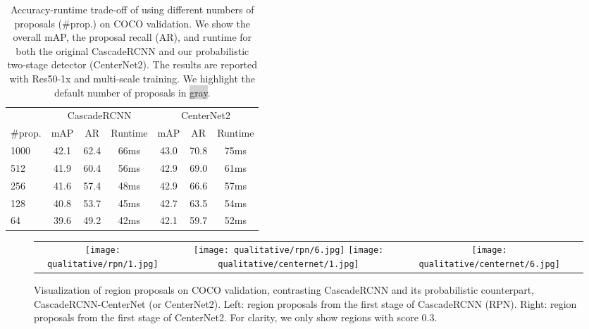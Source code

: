 \documentclass{article}
\begin{document}
\begin{table}[!t]
\centering
\begin{tabular}{@{}l@{\ \ }c@{\ \ \ }c@{\ \ \ }c@{\ \ \ }c@{\ \ \ }c@{\ \ \ }c}
\toprule
 & \multicolumn{3}{c}{CascadeRCNN} & \multicolumn{3}{c}{CenterNet2} \\
\#prop. & mAP & AR & Runtime & mAP & AR & Runtime \\
\cmidrule(r){1-1}
\cmidrule(r){2-4}
\cmidrule(r){5-7}
\rowcolor{lightgray}1000 & 42.1 & 62.4 &  66ms & \cellcolor{white}43.0 & \cellcolor{white}70.8  & \cellcolor{white}75ms \\
512 & 41.9 & 60.4 & 56ms & 42.9 & 69.0 & 61ms \\
\rowcolor{lightgray}\cellcolor{white}256 & \cellcolor{white}41.6 & \cellcolor{white}57.4 & \cellcolor{white} 48ms & 42.9 &  66.6 & 57ms \\
128 & 40.8 & 53.7 & 45ms & 42.7 & 63.5 & 54ms \\
64 & 39.6 & 49.2 & 42ms & 42.1 & 59.7 & 52ms \\
\bottomrule
\end{tabular}
\vspace{-2mm}
\caption{Accuracy-runtime trade-off of using different numbers of proposals (\#prop.) on COCO validation. We show the overall mAP, the proposal recall (AR), and runtime for both the original CascadeRCNN and our probabilistic two-stage detector (CenterNet2). The results are reported with Res50-1x and multi-scale training. We highlight the default number of proposals in \colorbox{lightgray}{gray}.}
\label{table:num_proposals}
\vspace{-6mm}
\end{table}



{
\begin{figure*}[t]
\centering
     \begin{tabular}{c@{}c@{}c@{}c}
      \texttt{[image: qualitative/rpn/1.jpg]}
      &\texttt{[image: qualitative/rpn/6.jpg]}
      \texttt{[image: qualitative/centernet/1.jpg]}
      &\texttt{[image: qualitative/centernet/6.jpg]}
      \end{tabular}
      \vspace{-3mm}
      \caption{Visualization of region proposals on COCO validation, contrasting CascadeRCNN and its probabilistic counterpart, CascadeRCNN-CenterNet (or CenterNet2). Left: region proposals from the first stage of CascadeRCNN (RPN). Right: region proposals from the first stage of CenterNet2. For clarity, we only show regions with score 0.3. }
      \label{fig:demo}
      \vspace{-2mm}
\end{figure*}
}
\end{document}
